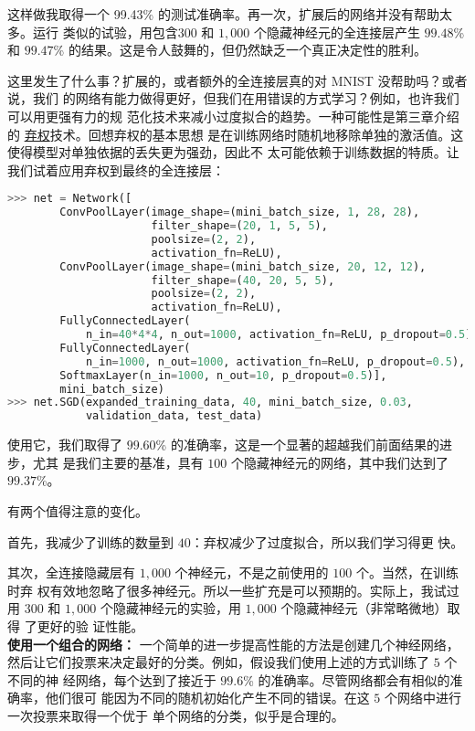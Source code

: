 这样做我取得一个 99.43\% 的测试准确率。再一次，扩展后的网络并没有帮助太多。运行
类似的试验，用包含$300$ 和 $1,000$ 个隐藏神经元的全连接层产生 $99.48$\% 和
$99.47$\% 的结果。这是令人鼓舞的，但仍然缺乏一个真正决定性的胜利。

\label{final_conv}
这里发生了什么事？扩展的，或者额外的全连接层真的对 MNIST 没帮助吗？或者说，我们
的网络有能力做得更好，但我们在用错误的方式学习？例如，也许我们可以用更强有力的规
范化技术来减小过度拟合的趋势。一种可能性是第三章介绍的%
\hyperref[sec:other_techniques_for_regularization]{弃权}技术。回想弃权的基本思想
是在训练网络时随机地移除单独的激活值。这使得模型对单独依据的丢失更为强劲，因此不
太可能依赖于训练数据的特质。让我们试着应用弃权到最终的全连接层：
\begin{lstlisting}[language=Python]
>>> net = Network([
        ConvPoolLayer(image_shape=(mini_batch_size, 1, 28, 28), 
                      filter_shape=(20, 1, 5, 5), 
                      poolsize=(2, 2), 
                      activation_fn=ReLU),
        ConvPoolLayer(image_shape=(mini_batch_size, 20, 12, 12), 
                      filter_shape=(40, 20, 5, 5), 
                      poolsize=(2, 2), 
                      activation_fn=ReLU),
        FullyConnectedLayer(
            n_in=40*4*4, n_out=1000, activation_fn=ReLU, p_dropout=0.5),
        FullyConnectedLayer(
            n_in=1000, n_out=1000, activation_fn=ReLU, p_dropout=0.5),
        SoftmaxLayer(n_in=1000, n_out=10, p_dropout=0.5)], 
        mini_batch_size)
>>> net.SGD(expanded_training_data, 40, mini_batch_size, 0.03, 
            validation_data, test_data)
\end{lstlisting}

使用它，我们取得了 $99.60$\% 的准确率，这是一个显著的超越我们前面结果的进步，尤其
是我们主要的基准，具有 $100$ 个隐藏神经元的网络，其中我们达到了 $99.37$\%。

有两个值得注意的变化。

首先，我减少了训练\epochs{}的数量到 $40$：弃权减少了过度拟合，所以我们学习得更
快。

其次，全连接隐藏层有 $1,000$ 个神经元，不是之前使用的 $100$ 个。当然，在训练时弃
权有效地忽略了很多神经元。所以一些扩充是可以预期的。实际上，我试过
用 $300$ 和 $1,000$ 个隐藏神经元的实验，用 $1,000$ 个隐藏神经元（非常略微地）取得
了更好的验
证性能。\\

\textbf{使用一个组合的网络：} 一个简单的进一步提高性能的方法是创建几个神经网络，
然后让它们投票来决定最好的分类。例如，假设我们使用上述的方式训练了 $5$ 个不同的神
经网络，每个达到了接近于 $99.6$\% 的准确率。尽管网络都会有相似的准确率，他们很可
能因为不同的随机初始化产生不同的错误。在这 $5$ 个网络中进行一次投票来取得一个优于
单个网络的分类，似乎是合理的。

